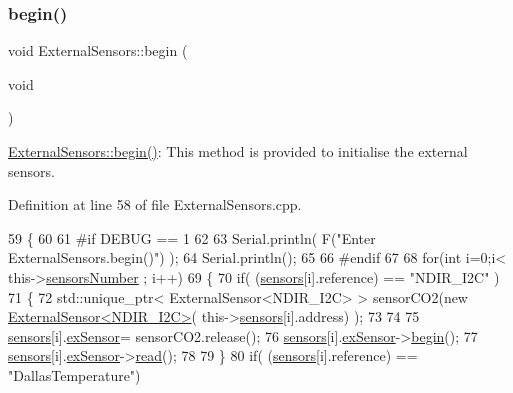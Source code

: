 \subsubsection{\texorpdfstring{begin()}{begin()}}
{\footnotesize\ttfamily void External\+Sensors\+::begin (\begin{DoxyParamCaption}\item[{void}]{ }\end{DoxyParamCaption})}

\hyperlink{class_external_sensors_a58ede0d786a86417254708870f04a21e}{External\+Sensors\+::begin()}\+: This method is provided to initialise the external sensors. 

Definition at line 58 of file External\+Sensors.\+cpp.


\begin{DoxyCode}
59 \{
60 
61 \textcolor{preprocessor}{#if DEBUG == 1}
62 
63     Serial.println( F(\textcolor{stringliteral}{"Enter ExternalSensors.begin()"}) );
64     Serial.println();
65 
66 \textcolor{preprocessor}{#endif }
67 
68     \textcolor{keywordflow}{for}(\textcolor{keywordtype}{int} i=0;i< this->\hyperlink{class_external_sensors_a58e4fbf9adeae787d92be5fa33043b5d}{sensorsNumber} ; i++)
69     \{
70         \textcolor{keywordflow}{if}( (\hyperlink{class_external_sensors_a284233f884fcf00154a44740cf1d9e1e}{sensors}[i].reference) == \textcolor{stringliteral}{"NDIR\_I2C"} )
71         \{   
72             std::unique\_ptr< ExternalSensor<NDIR\_I2C> > sensorCO2(\textcolor{keyword}{new} 
      \hyperlink{class_external_sensor_3_01_n_d_i_r___i2_c_01_4}{ExternalSensor<NDIR\_I2C>}( this->\hyperlink{class_external_sensors_a284233f884fcf00154a44740cf1d9e1e}{sensors}[i].address) );
73 
74 
75             \hyperlink{class_external_sensors_a284233f884fcf00154a44740cf1d9e1e}{sensors}[i].\hyperlink{struct_external_sensors_1_1sensor_a9bca150fd468b8d0e090e6d72c5c2b48}{exSensor}= sensorCO2.release();
76             \hyperlink{class_external_sensors_a284233f884fcf00154a44740cf1d9e1e}{sensors}[i].\hyperlink{struct_external_sensors_1_1sensor_a9bca150fd468b8d0e090e6d72c5c2b48}{exSensor}->\hyperlink{class_base_external_sensor_a87d132803d4f4fdd4e66332809f0c9a0}{begin}();
77             \hyperlink{class_external_sensors_a284233f884fcf00154a44740cf1d9e1e}{sensors}[i].\hyperlink{struct_external_sensors_1_1sensor_a9bca150fd468b8d0e090e6d72c5c2b48}{exSensor}->\hyperlink{class_base_external_sensor_a1564f16deacf57b51b9948ac29db4291}{read}();
78 
79         \}
80         \textcolor{keywordflow}{if}( (\hyperlink{class_external_sensors_a284233f884fcf00154a44740cf1d9e1e}{sensors}[i].reference) == \textcolor{stringliteral}{"DallasTemperature"})

\end{DoxyCode}
